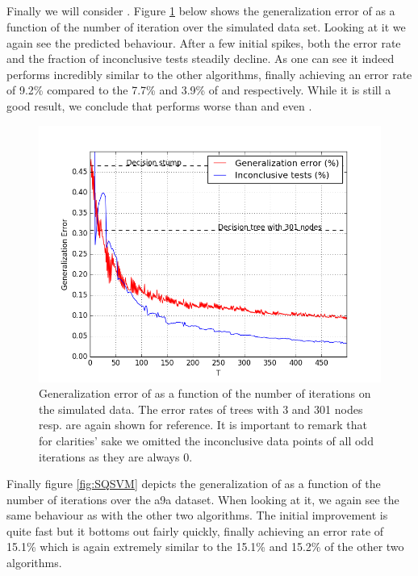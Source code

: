 \subsection{\squintB}
\label{subsec:sqPracPerf}
Finally we will consider \squintB. Figure \ref{fig:SQGD} below shows the generalization error of \squintB as a function of the number of iteration over the simulated data set. Looking at it we again see the predicted behaviour. After a few initial spikes, both the error rate and the fraction of inconclusive tests steadily decline. As one can see it indeed performs incredibly similar to the other algorithms, finally achieving an error rate of 9.2\% compared to the 7.7\% and 3.9\% of \adaB and \NHB respectively. While it is still a good result, we conclude that \squintB performs worse than  \NHB and even \adaB. 
\begin{figure}[!ht]
  \centering
     \includegraphics[width=\graphWidth]{generated/SQGD.png}
  \caption{Generalization error of \squintB as a function of the number of iterations on the simulated data. The error rates of trees with 3 and 301 nodes resp. are again shown for reference. It is important to remark that for clarities' sake we omitted the inconclusive data points of all odd iterations as they are always 0.}
      \label{fig:SQGD}
\end{figure}

\par Finally figure \ref{fig:SQSVM} depicts the generalization of \squintB as a function of the number of iterations over the a9a dataset. When looking at it, we again see the same behaviour as with the other two algorithms. The initial improvement is quite fast but it bottoms out fairly quickly, finally achieving an error rate of 15.1\% which is again extremely similar to the 15.1\% and 15.2\% of the other two algorithms. 


